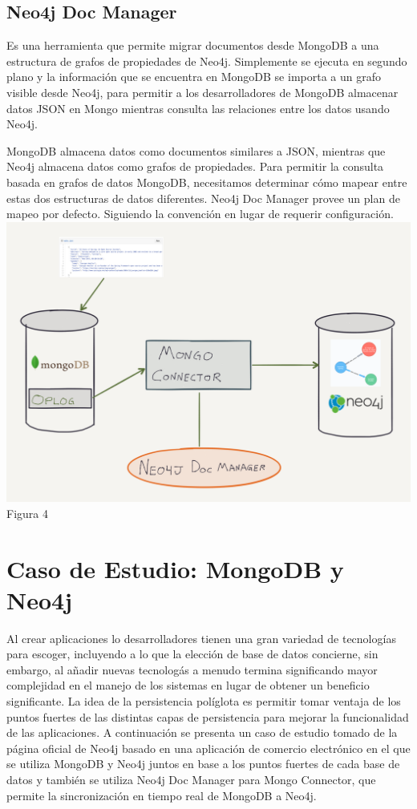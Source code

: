 \documentclass[conference]{IEEEtran}
\begin{document}
\subsection{Neo4j Doc Manager}
Es una herramienta que permite migrar documentos desde MongoDB a una estructura de grafos de propiedades de Neo4j. Simplemente se ejecuta en segundo plano y la informaci\'on que se encuentra en MongoDB se importa a un grafo visible desde Neo4j, para permitir a los desarrolladores de MongoDB almacenar datos JSON en Mongo mientras consulta las relaciones entre los datos usando Neo4j.

MongoDB almacena datos como documentos similares a JSON, mientras que Neo4j almacena datos como grafos de propiedades. Para permitir la consulta basada en grafos de datos MongoDB, necesitamos determinar c\'omo mapear entre estas dos estructuras de datos diferentes. Neo4j Doc Manager provee un plan de mapeo por defecto. Siguiendo la convenci\'on en lugar de requerir configuraci\'on.\cite{doc}
\\
\centering
\includegraphics[scale=0.3]{Imagenes/mongo_connector.png}\\Figura 4
\section{Caso de Estudio: MongoDB y Neo4j}
Al crear aplicaciones lo desarrolladores tienen una gran variedad de tecnolog\'ias para escoger, incluyendo a lo que la elecci\'on de base de datos  concierne, sin embargo, al a\~nadir nuevas tecnolog\'as a menudo termina significando mayor complejidad en el manejo de los sistemas en lugar de obtener un beneficio significante. La idea de la persistencia pol\'iglota es permitir tomar ventaja de los puntos fuertes de las distintas capas de persistencia para mejorar la funcionalidad de las aplicaciones. A continuaci\'on se presenta un caso de estudio tomado de la p\'agina oficial de Neo4j \cite{caso} basado en una aplicaci\'on de comercio electr\'onico en el que se utiliza MongoDB y Neo4j juntos en base a los puntos fuertes de cada base de datos y tambi\'en se utiliza Neo4j Doc Manager para Mongo Connector, que permite la sincronizaci\'on en tiempo real de MongoDB a Neo4j.
\end{document}
